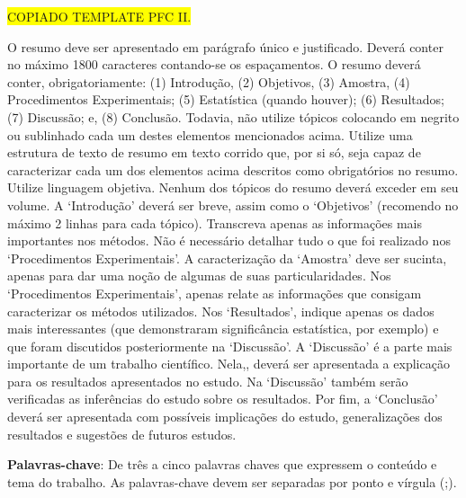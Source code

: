 
\begin{resumo}

\colorbox{yellow}{COPIADO TEMPLATE PFC II.}

O resumo deve ser apresentado em parágrafo único e justificado. Deverá conter no máximo 1800 caracteres contando-se os espaçamentos. O resumo deverá conter, obrigatoriamente: (1) Introdução, (2) Objetivos, (3) Amostra, (4) Procedimentos Experimentais; (5) Estatística (quando houver); (6) Resultados; (7) Discussão; e, (8) Conclusão. Todavia, não utilize tópicos colocando em negrito ou sublinhado cada um destes elementos mencionados acima. Utilize uma estrutura de texto de resumo em texto corrido que, por si só, seja capaz de caracterizar cada um dos elementos acima descritos como obrigatórios no resumo. Utilize linguagem objetiva. Nenhum dos tópicos do resumo deverá exceder em seu volume. A ‘Introdução’ deverá ser breve, assim como o ‘Objetivos’ (recomendo no máximo 2 linhas para cada tópico). Transcreva apenas as informações mais importantes nos métodos. Não é necessário detalhar tudo o que foi realizado nos ‘Procedimentos Experimentais’. A caracterização da ‘Amostra’ deve ser sucinta, apenas para dar uma noção de algumas de suas particularidades. Nos ‘Procedimentos Experimentais’, apenas relate as informações que consigam caracterizar os métodos utilizados. Nos ‘Resultados’, indique apenas os dados mais interessantes (que demonstraram significância estatística, por exemplo) e que foram discutidos posteriormente na ‘Discussão’. A ‘Discussão’ é a parte mais importante de um trabalho científico. Nela,, deverá ser apresentada a explicação para os resultados apresentados no estudo. Na ‘Discussão’ também serão verificadas as inferências do estudo sobre os resultados. Por fim, a ‘Conclusão’ deverá ser apresentada com possíveis implicações do estudo, generalizações dos resultados e sugestões de futuros estudos.

    \par\vspace{\baselineskip}

    \textbf{Palavras-chave}: De três a cinco palavras chaves que expressem o conteúdo e tema do trabalho. As palavras-chave devem ser separadas por ponto e vírgula (;).
\end{resumo}
